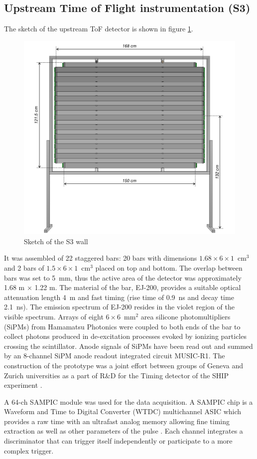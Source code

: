     
    \subsection{Upstream Time of Flight instrumentation (S3)}
    
    The sketch of the upstream ToF detector is shown in figure \ref{fig:S3sketch}.
     \begin{figure}
      \centering
    \includegraphics[width=0.6\linewidth]{files/Figures/uToF_sketch.pdf}
    	\caption{Sketch of the S3 wall}
    		\label{fig:S3sketch}
    \end{figure}
It was assembled of 22 staggered bars:  20 bars with dimensions $1.68 \times 6 \times 1$~cm$^3$ 
and 2 bars of  $1.5 \times 6 \times 1$~cm$^3$ placed on top and bottom.
The overlap between bars was set to 5~mm, thus the active area of the detector was approximately 1.68 m $\times$ 1.22 m.
The material of the bar,
EJ-200, provides a suitable optical attenuation length 4~m
and fast timing (rise time of 0.9~ns and decay time 2.1~ns). 
The emission spectrum of EJ-200 resides in the violet region of the visible spectrum.
Arrays of eight $6 \times 6$~mm$^2$ area silicone photomultipliers (SiPMs) from Hamamatsu Photonics were coupled to both ends of the bar to collect photons produced in de-excitation processes evoked by ionizing particles crossing the scintillator.
Anode signals of SiPMs have been read out and summed by an 8-channel SiPM anode readout integrated circuit MUSIC-R1. 
The construction of the prototype was a joint effort between groups of Geneva and Zurich universities as a part of R\&D for the Timing detector of the SHIP experiment \cite{AK}.

A 64-ch SAMPIC  module was used for the data acquisition.
A SAMPIC chip is a Waveform and Time to Digital Converter (WTDC) multichannel ASIC which provides a raw time with an ultrafast analog memory allowing fine timing extraction as well as other parameters of the pulse \cite{SAMPIC}. 
Each channel integrates a discriminator that can trigger itself independently or participate to a more complex trigger. 

